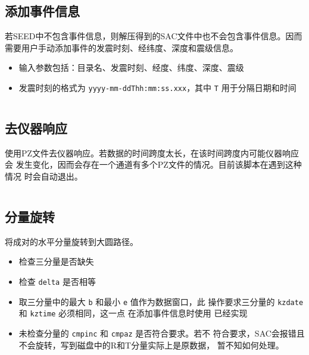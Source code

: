 \subsection{添加事件信息}
\label{subsec:event-info-perl}
若SEED中不包含事件信息，则解压得到的SAC文件中也不会包含事件信息。因而
需要用户手动添加事件的发震时刻、经纬度、深度和震级信息。
\begin{itemize}
\item 输入参数包括：目录名、发震时刻、经度、纬度、深度、震级
\item 发震时刻的格式为 \texttt{yyyy-mm-ddThh:mm:ss.xxx}，其中 \texttt{T}
    用于分隔日期和时间
\end{itemize}
\inputminted{perl}{./call-in-script/4.eventinfo.pl}

\subsection{去仪器响应}
\label{subsec:transfer-perl}
使用PZ文件去仪器响应。若数据的时间跨度太长，在该时间跨度内可能仪器响应会
发生变化，因而会存在一个通道有多个PZ文件的情况。目前该脚本在遇到这种情况
时会自动退出。
\inputminted{perl}{./call-in-script/5.transfer.pl}

\subsection{分量旋转}
\label{subsec:rotate-perl}
将成对的水平分量旋转到大圆路径。
\begin{itemize}
\item 检查三分量是否缺失
\item 检查 \texttt{delta} 是否相等
\item 取三分量中的最大 \texttt{b} 和最小 \texttt{e} 值作为数据窗口，此
    操作要求三分量的 \texttt{kzdate} 和 \texttt{kztime} 必须相同，这一点
    在添加事件信息时使用  已经实现
\item 未检查分量的 \texttt{cmpinc} 和 \texttt{cmpaz} 是否符合要求。若不
    符合要求，SAC会报错且不会旋转，写到磁盘中的R和T分量实际上是原数据，
    暂不知如何处理。
\end{itemize}
\inputminted{perl}{./call-in-script/6.rotate.pl}

